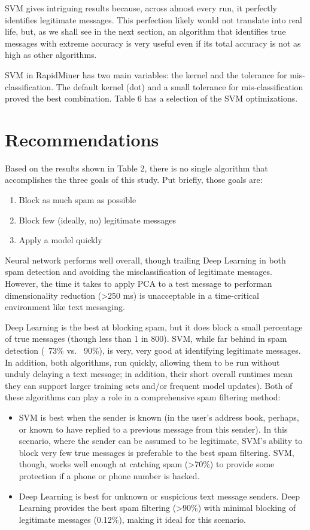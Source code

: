 \documentclass[10pt,journal,compsoc]{IEEEtran}
\begin{document}
SVM gives intriguing results because, across almost every run, it perfectly identifies legitimate messages. This perfection likely would not translate into real life, but, as we shall see in the next section, an algorithm that identifies true messages with extreme accuracy is very useful even if its total accuracy is not as high as other algorithms.

SVM in RapidMiner has two main variables: the kernel and the tolerance for mis-classification. \cite{RapidMiner} The default kernel (dot) and a small tolerance for mis-classification proved the best combination. Table 6 has a selection of the SVM optimizations.

\section{Recommendations}

Based on the results shown in Table 2, there is no single algorithm that accomplishes the three goals of this study. Put briefly, those goals are:

\begin{enumerate}
    \item Block as much spam as possible
    \item Block few (ideally, no) legitimate messages
    \item Apply a model quickly
\end{enumerate}

Neural network performs well overall, though trailing Deep Learning in both spam detection and avoiding the misclassification of legitimate messages. However, the time it takes to apply PCA to a test message to performan dimensionality reduction (\textgreater 250 ms) is unacceptable in a time-critical environment like text messaging.

Deep Learning is the best at blocking spam, but it does block a small percentage of true messages (though less than 1 in 800). SVM, while far behind in spam detection (~73\% vs. ~90\%), is very, very good at identifying legitimate messages. In addition, both algorithms, run quickly, allowing them to be run without unduly delaying a text message; in addition, their short overall runtimes mean they can support larger training sets and/or frequent model updates). Both of these algorithms can play a role in a comprehensive spam filtering method:

\begin{itemize}
    \item SVM is best when the sender is known (in the user's address book, perhaps, or known to have replied to a previous message from this sender). In this scenario, where the sender can be assumed to be legitimate, SVM's ability to block very few true messages is preferable to the best spam filtering. SVM, though, works well enough at catching spam (>70\%) to provide some protection if a phone or phone number is hacked.
    \item Deep Learning is best for unknown or suspicious text message senders. Deep Learning provides the best spam filtering (>90\%) with minimal blocking of legitimate messages (0.12\%), making it ideal for this scenario.
\end{itemize}
\end{document}
